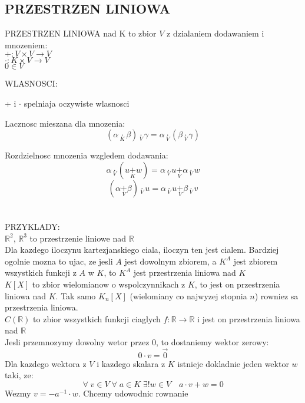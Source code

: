 \documentclass{article}
\newcommand{\R}{\mathbb{R}}
\begin{document}
\subsection*{PRZESTRZEN LINIOWA}
  \begin{center}
    \color{def}PRZESTRZEN LINIOWA nad K \color{txt}to zbior $V$ z dzialaniem dodawaniem i mnozeniem:\smallskip\\
    $+:V\times V\to V$\smallskip\\
    $\cdot:K\times V\to V$\smallskip\\
    $0\in V$
  \end{center}
  \color{def}WLASNOSCI:\color{txt}\smallskip\par
    + i $\cdot$ spelniaja oczywiste wlasnosci\smallskip\par
    Lacznosc mieszana dla mnozenia:
    $$(\alpha \underset{K}{\cdot}\beta)\underset{V}{\cdot}\gamma = \alpha\underset{V}{\cdot}(\beta\underset{V}{\cdot}\gamma)$$\par
    Rozdzielnosc mnozenia wzgledem dodawania:
    $$\alpha\underset{V}{\cdot}(u\underset{K}{+}w) = \alpha\underset{V}{\cdot}u\underset{V}{+}\alpha\underset{V}{\cdot}w$$
    $$(\alpha\underset{V}{+}\beta)\underset{V}{\cdot}u = \alpha\underset{V}{\cdot}u\underset{V}{+}\beta\underset{V}{\cdot}v$$ \\ \\
  \color{emp}PRZYKLADY:\color{txt}\smallskip\\
    $\R^2$, $\R^3$ to przestrzenie liniowe nad $\R$\medskip\\
    Dla kazdego iloczynu kartezjanskiego ciala, iloczyn ten jest cialem. Bardziej ogolnie mozna to ujac, ze jesli $A$ jest dowolnym zbiorem, a $K^A$ jest zbiorem wszystkich funkcji z $A$ w $K$, to $K^A$ jest przestrzenia liniowa nad $K$\medskip\\
    $K[X]$ to zbior wielomianow o wspolczynnikach z $K$, to jest on przestrzenia liniowa nad $K$. Tak samo $K_n[X]$ (wielomiany co najwyzej stopnia $n$) rowniez sa przestrzenia liniowa.\medskip\\
    $C(\R)$ to zbior wszystkich funkcji ciaglych $f:\R\to\R$ i jest on przestrzenia liniowa nad $\R$\bigskip\\
  Jesli przemnozymy dowolny wetor przez 0, to dostaniemy \color{acc}wektor zerowy\color{txt}:
  $$0\cdot v=\overset{\to}{0}$$
  Dla kazdego wektora z $V$ i kazdego skalara z $K$ istnieje dokladnie jeden wektor $w$ taki, ze:
  $$\forall\;v\in V\;\forall\;a\in K\;\exists!w\in V\quad a\cdot v+w=0$$
  Wezmy $v=-a^{-1}\cdot w$. Chcemy udowodnic rownanie
\end{document}
